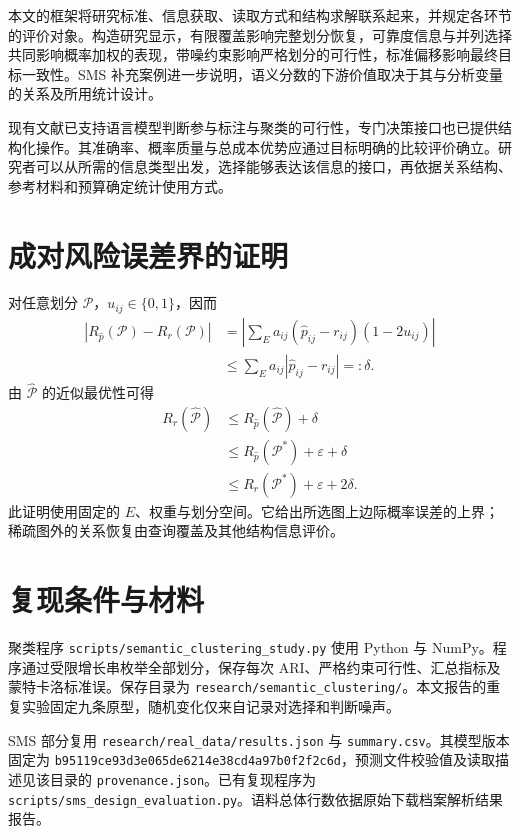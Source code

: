 \documentclass[UTF8,a4paper,zihao=-4,fontset=fandol]{ctexart}
\begin{document}
本文的框架将研究标准、信息获取、读取方式和结构求解联系起来，并规定各环节的评价对象。构造研究显示，有限覆盖影响完整划分恢复，可靠度信息与并列选择共同影响概率加权的表现，带噪约束影响严格划分的可行性，标准偏移影响最终目标一致性。SMS 补充案例进一步说明，语义分数的下游价值取决于其与分析变量的关系及所用统计设计。

现有文献已支持语言模型判断参与标注与聚类的可行性，专门决策接口也已提供结构化操作。其准确率、概率质量与总成本优势应通过目标明确的比较评价确立。研究者可以从所需的信息类型出发，选择能够表达该信息的接口，再依据关系结构、参考材料和预算确定统计使用方式。

\appendix
\section{成对风险误差界的证明}\label{app:bound}

对任意划分 $\mathcal P$，$u_{ij}\in\{0,1\}$，因而
\begin{align}
 |R_{\widehat p}(\mathcal P)-R_r(\mathcal P)|
 &=\left|\sum_E a_{ij}(\widehat p_{ij}-r_{ij})(1-2u_{ij})\right|\\
 &\leq\sum_E a_{ij}|\widehat p_{ij}-r_{ij}|=:\delta.
\end{align}
由 $\widehat{\mathcal P}$ 的近似最优性可得
\begin{align}
 R_r(\widehat{\mathcal P})
 &\leq R_{\widehat p}(\widehat{\mathcal P})+\delta\\
 &\leq R_{\widehat p}(\mathcal P^*)+\varepsilon+\delta\\
 &\leq R_r(\mathcal P^*)+\varepsilon+2\delta.
\end{align}
此证明使用固定的 $E$、权重与划分空间。它给出所选图上边际概率误差的上界；稀疏图外的关系恢复由查询覆盖及其他结构信息评价。

\section{复现条件与材料}\label{app:materials}

聚类程序 \nolinkurl{scripts/semantic_clustering_study.py} 使用 Python 与 NumPy。程序通过受限增长串枚举全部划分，保存每次 ARI、严格约束可行性、汇总指标及蒙特卡洛标准误。保存目录为 \nolinkurl{research/semantic_clustering/}。本文报告的重复实验固定九条原型，随机变化仅来自记录对选择和判断噪声。

SMS 部分复用 \nolinkurl{research/real_data/results.json} 与 \nolinkurl{summary.csv}。其模型版本固定为 \nolinkurl{b95119ce93d3e065de6214e38cd4a97b0f2f2c6d}，预测文件校验值及读取描述见该目录的 \nolinkurl{provenance.json}。已有复现程序为 \nolinkurl{scripts/sms_design_evaluation.py}。语料总体行数依据原始下载档案解析结果报告。
\end{document}
